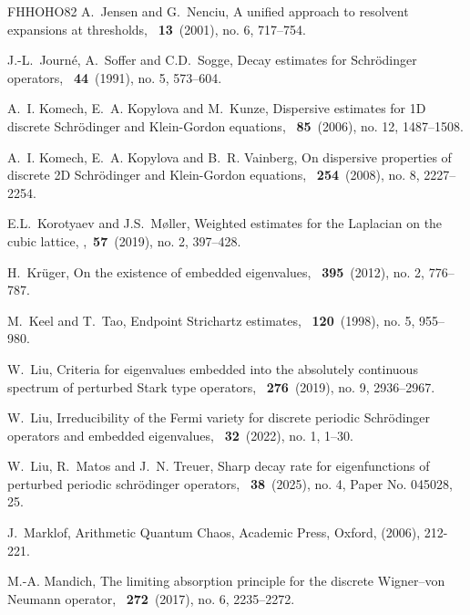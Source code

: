 \documentclass[reqno, 11pt]{amsart}
\numberwithin{equation}{section}
\begin{document}
\begin{thebibliography}{FHHOHO82}
A.~Jensen and G.~Nenciu,
\newblock A unified approach to resolvent expansions at thresholds,
~{\bf13}~(2001), no. 6, 717--754.

J.-L.~Journ\'{e}, A.~Soffer and C.D.~Sogge,
\newblock Decay estimates for Schr\"{o}dinger operators,
~{\bf44}~(1991), no. 5, 573--604.

A.~I. Komech, E.~A. Kopylova and M.~Kunze,
\newblock Dispersive estimates for 1{D} discrete {S}chr\"odinger and
  {K}lein-{G}ordon equations,
~{\bf85}~(2006), no. 12, 1487--1508.

A.~I. Komech, E.~A. Kopylova and B.~R. Vainberg,
\newblock On dispersive properties of discrete 2{D} {S}chr\"odinger and
  {K}lein-{G}ordon equations,
~{\bf254}~(2008), no. 8, 2227--2254.

E.L.~Korotyaev and J.S.~M{\o}ller,
\newblock Weighted estimates for the {L}aplacian on the cubic lattice,
,~{\bf57}~(2019), no. 2, 397--428.

H.~Kr\"uger,
\newblock On the existence of embedded eigenvalues,
~{\bf395}~(2012), no. 2, 776--787.

M.~Keel and T.~Tao,
\newblock Endpoint {S}trichartz estimates,
~{\bf120}~(1998), no. 5, 955--980.

W.~Liu,
\newblock Criteria for eigenvalues embedded into the absolutely continuous
  spectrum of perturbed {S}tark type operators,
~{\bf276}~(2019), no. 9, 2936--2967.

W.~Liu,
\newblock Irreducibility of the {F}ermi variety for discrete periodic
  {S}chr\"odinger operators and embedded eigenvalues,
~{\bf32}~(2022), no. 1, 1--30.

W.~{Liu}, R.~{Matos} and J.~N. {Treuer},
\newblock Sharp decay rate for eigenfunctions of perturbed periodic
  schr\"odinger operators,
~{\bf38}~(2025), no. 4, Paper No. 045028, 25.


J.~Marklof,
\newblock Arithmetic Quantum Chaos,
Academic Press, Oxford, (2006), 212-221.

M.-A. Mandich,
\newblock The limiting absorption principle for the discrete {W}igner--von
  {N}eumann operator,
~{\bf272}~(2017), no. 6, 2235--2272.


\end{thebibliography}
\end{document}
